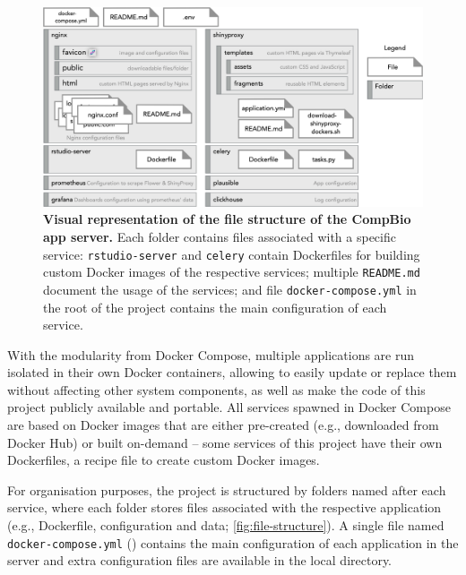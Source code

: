 \begin{figure}[!b]
  \includegraphics[width=1\textwidth]{images/app-server/file-structure}
  \centering
  \caption[App server's file structure]{\textbf{Visual representation of the file structure of the CompBio app server.} Each folder contains files associated with a specific service: \texttt{rstudio-server} and \texttt{celery} contain Dockerfiles for building custom Docker images of the respective services; multiple \texttt{README.md} document the usage of the services; and file \texttt{docker-compose.yml} in the root of the project contains the main configuration of each service.}
  \label{fig:file-structure}
\end{figure}

With the modularity from Docker Compose, multiple applications are run isolated in their own Docker containers, allowing to easily update or replace them without affecting other system components, as well as make the code of this project publicly available and portable. All services spawned in Docker Compose are based on Docker images that are either pre-created (e.g., downloaded from Docker Hub) or built on-demand -- some services of this project have their own Dockerfiles, a recipe file to create custom Docker images.

For organisation purposes, the project is structured by folders named after each service, where each folder stores files associated with the respective application (e.g., Dockerfile, configuration and data; \autoref{fig:file-structure}). A single file named \texttt{docker-compose.yml} () contains the main configuration of each application in the server and extra configuration files are available in the local directory.

